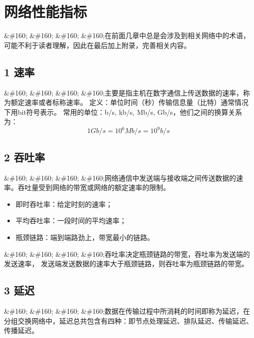 \chapter{网络性能指标}
\label{网络性能指标}

\&\#160; \&\#160; \&\#160; \&\#160;在前面几章中总是会涉及到相关网络中的术语，可能不利于读者理解，因此在最后加上附录，完善相关内容。

\section{1 速率}
\label{1速率}

\&\#160; \&\#160; \&\#160; \&\#160;主要是指主机在数字通信上传送数据的速率，称为额定速率或者标称速率。
定义：单位时间（秒）传输信息量（比特）通常情况下用bit符号表示。
常用的单位：b\slash s, kb\slash s, Mb\slash s, Gb\slash s，他们之间的换算关系为：
$$1Gb/s = 10^6 Mb/s = 10^9 b/s$$

\section{2 吞吐率}
\label{2吞吐率}

\&\#160; \&\#160; \&\#160; \&\#160;网络通信中发送端与接收端之间传送数据的速率。吞吐量受到网络的带宽或网络的额定速率的限制。

\begin{itemize}
\item 即时吞吐率：给定时刻的速率；

\item 平均吞吐率：一段时间的平均速率；

\item 瓶颈链路：端到端路劲上，带宽最小的链路。

\end{itemize}

\&\#160; \&\#160; \&\#160; \&\#160;吞吐率决定瓶颈链路的带宽，吞吐率为发送端的发送速率， 发送端发送数据的速率大于瓶颈链路，则吞吐率为瓶颈链路的带宽。

\section{3 延迟}
\label{3延迟}

\&\#160; \&\#160; \&\#160; \&\#160;数据在传输过程中所消耗的时间即称为延迟，在分组交换网络中，延迟总共包含有四种：即节点处理延迟、排队延迟、传输延迟、传播延迟。

